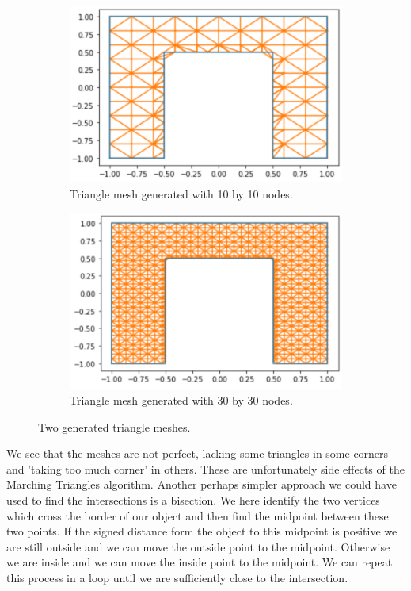 \begin{figure}
	\centering
	\begin{subfigure}[b]{0.49\linewidth}
		\centering
		\includegraphics[width=\linewidth]{Materials/Triangles/mesh10}
		\caption{Triangle mesh generated with 10 by 10 nodes.}
	\end{subfigure}
	\hfill
	\begin{subfigure}[b]{0.49\linewidth}
		\centering
		\includegraphics[width=\linewidth]{Materials/Triangles/mesh30}
		\caption{Triangle mesh generated with 30 by 30 nodes.}
	\end{subfigure}
	\caption{Two generated triangle meshes.}
	\label{ourmesh}
\end{figure} 
We see that the meshes are not perfect, lacking some triangles in some corners and 'taking too much corner' in others. These are unfortunately side effects of the Marching Triangles algorithm. Another perhaps simpler approach we could have used to find the intersections is a bisection. We here identify the two vertices which cross the border of our object and then find the midpoint between these two points. If the signed distance form the object to this midpoint is positive we are still outside and we can move the outside point to the midpoint. Otherwise we are inside and we can move the inside point to the midpoint. We can repeat this process in a loop until we are sufficiently close to the intersection.